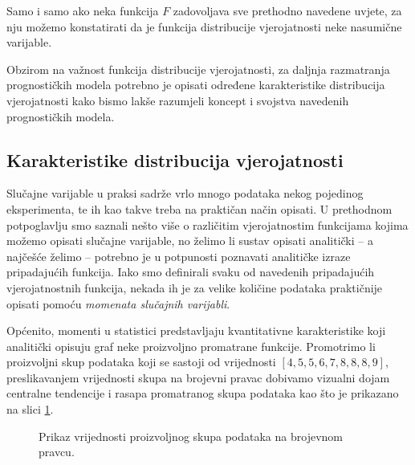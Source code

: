 \documentclass[a4paper,12pt,oneside]{memoir}
\begin{document}
                    Samo i samo ako neka funkcija $F$ zadovoljava sve prethodno navedene uvjete, za nju možemo konstatirati da je funkcija distribucije vjerojatnosti neke nasumične varijable.
                    
                    Obzirom na važnost funkcija distribucije vjerojatnosti, za daljnja razmatranja prognostičkih modela potrebno je opisati određene karakteristike distribucija vjerojatnosti kako bismo lakše razumjeli koncept i svojstva navedenih prognostičkih modela.

            \subsection{Karakteristike distribucija vjerojatnosti}

                Slučajne varijable u praksi sadrže vrlo mnogo podataka nekog pojedinog eksperimenta, te ih kao takve treba na praktičan način opisati. U prethodnom potpoglavlju smo saznali nešto više o različitim vjerojatnostim funkcijama kojima možemo opisati slučajne varijable, no želimo li sustav opisati analitički -- a najčešće želimo -- potrebno je u potpunosti poznavati analitičke izraze pripadajućih funkcija. Iako smo definirali svaku od navedenih pripadajućih vjerojatnostnih funkcija, nekada ih je za velike količine podataka praktičnije opisati pomoću \textit{momenata slučajnih varijabli}.

                Općenito, momenti u statistici predstavljaju kvantitativne karakteristike koji analitički opisuju graf neke proizvoljno promatrane funkcije. Promotrimo li proizvoljni skup podataka koji se sastoji od vrijednosti $[4,5,5,6,7,8,8,8,9]$, preslikavanjem vrijednosti skupa na brojevni pravac dobivamo vizualni dojam centralne tendencije i rasapa promatranog skupa podataka kao što je prikazano na slici \ref{fig:45}.

                \begin{figure}[H]
                    \centering
                    \caption{Prikaz vrijednosti proizvoljnog skupa podataka na brojevnom pravcu.}
                    \label{fig:45}
                \end{figure}
\end{document}
